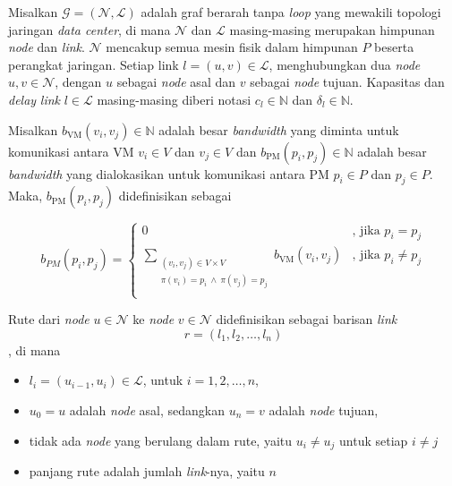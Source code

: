 Misalkan $\mathcal{G}=(\mathcal{N},\mathcal{L})$ adalah graf berarah tanpa \textit{loop} yang mewakili topologi jaringan \textit{data center}, di mana $\mathcal{N}$ dan $\mathcal{L}$ masing-masing merupakan himpunan \textit{node} dan \textit{link}. $\mathcal{N}$ mencakup semua mesin fisik dalam himpunan $P$ beserta perangkat jaringan. Setiap link $l = (u,v) \in \mathcal{L}$, menghubungkan dua \textit{node} $u, v \in \mathcal{N}$, dengan $u$ sebagai \textit{node} asal dan $v$ sebagai \textit{node} tujuan. Kapasitas dan \textit{delay} \textit{link} $l \in \mathcal{L}$ masing-masing diberi notasi $c_l \in \mathbb{N}$ dan $\delta_l \in \mathbb{N}$.

Misalkan $b_\text{VM}(v_i,v_j) \in \mathbb{N}$ adalah besar \textit{bandwidth} yang diminta untuk komunikasi antara VM $v_i \in V$ dan $v_j \in V$ dan $b_\text{PM}(p_i,p_j) \in \mathbb{N}$ adalah besar \textit{bandwidth} yang dialokasikan untuk komunikasi antara  PM $p_i \in P$ dan $p_j \in P$. Maka, $b_\text{PM}(p_i,p_j)$ didefinisikan sebagai 

\begin{equation*}
  b_{PM}(p_i,p_j) = 
  \begin{cases}
    0 
    & \text{, jika }p_i = p_j \\
    \displaystyle \sum_{\substack{(v_i,v_j)\in V \times V \\ \pi(v_i)=p_i\ \wedge\ \pi(v_j)=p_j}} b_\text{VM}(v_i,v_j) 
    & \text{, jika }p_i \neq p_j\\
  \end{cases}
\end{equation*}

Rute dari \textit{node} $u \in \mathcal{N}$ ke \textit{node} $v \in \mathcal{N}$ didefinisikan sebagai barisan \textit{link} \begin{equation*}r = (l_1,l_2,\dots, l_n)\end{equation*}, di mana
\begin{itemize}
  \item{$l_i = (u_{i-1},u_i) \in \mathcal{L}$, untuk $i = 1,2,\dots,n$},
  \item{$u_0=u$ adalah \textit{node} asal, sedangkan $u_n=v$ adalah \textit{node} tujuan}, 
  \item{tidak ada \textit{node} yang berulang dalam rute, yaitu $u_i \neq u_j$ untuk setiap $i \neq j$}
  \item{panjang rute adalah jumlah \textit{link}-nya, yaitu $n$}
\end{itemize}

